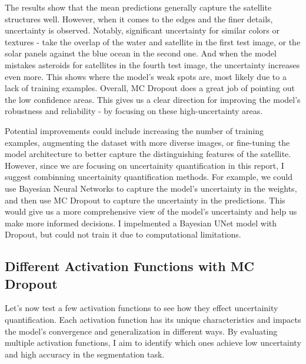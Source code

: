 \documentclass{article}
\begin{document}
The results show that the mean predictions generally capture the satellite structures well. However, when it comes to the 
edges and the finer details, uncertainty is observed. Notably, significant uncertainty for similar colors or textures - 
take the overlap of the water and satellite in the first test image, or the solar panels against the blue ocean in the 
second one. And when the model mistakes asteroids for satellites in the fourth test image, the uncertainty increases 
even more. This shows where the model's weak spots are, most likely due to a lack of training examples. Overall, MC Dropout 
does a great job of pointing out the low confidence areas. This gives us a clear direction for improving the model's robustness 
and reliability - by focusing on these high-uncertainty areas.
\vspace{1em}

Potential improvements could include increasing the number of training examples, augmenting the dataset with more diverse
images, or fine-tuning the model architecture to better capture the distinguishing features of the satellite. However, 
since we are focusing on uncertainity quantification in this report, I suggest combinning uncertainity quantification
methods. For example, we could use Bayesian Neural Networks to capture the model's uncertainty in the weights, and then
use MC Dropout to capture the uncertainty in the predictions. This would give us a more comprehensive view of the model's
uncertainty and help us make more informed decisions.  I impelmented a Bayesian UNet model with Dropout, but could not 
train it due to computational limitations.


\subsection{Different Activation Functions with MC Dropout}

Let's now test a few activation functions to see how they effect uncertainity quantification. Each activation function has 
its unique characteristics and impacts the model's convergence and generalization in different ways. By evaluating multiple 
activation functions, I aim to identify which ones achieve low uncertainty and high accuracy in the segmentation task.
\end{document}

